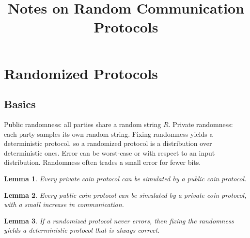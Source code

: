 \documentclass[11pt]{article}
\title{Notes on Random Communication Protocols}
\author{}
\date{}
\newtheorem{lemma}{Lemma}[section]
\begin{document}
\maketitle

\section{Randomized Protocols}

\subsection{Basics}
Public randomness: all parties share a random string $R$. Private randomness: each party samples its own random string. Fixing randomness yields a deterministic protocol, so a randomized protocol is a distribution over deterministic ones. Error can be worst-case or with respect to an input distribution. Randomness often trades a small error for fewer bits.

\begin{lemma}
Every private coin protocol can be simulated by a public coin protocol.
\end{lemma}

\begin{lemma}
Every public coin protocol can be simulated by a private coin protocol, with a small increase in communication.
\end{lemma}

\begin{lemma}
If a randomized protocol never errors, then fixing the randomness yields a deterministic protocol that is always correct.
\end{lemma}
\end{document}
